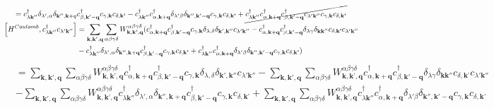 \documentclass[12pt,english,a4paper]{article}
\newcommand{\dg}{\dagger}
\begin{document}
\begin{appendices}
\begin{align}
= c^\dg_{\lambda \textbf{k}''} \delta_{\lambda',\alpha} \delta_{\textbf{k}'',\textbf{k}+q} &c_{\beta, \textbf{k}' - \textbf{q}}^\dg c_{\gamma, \textbf{k}}c_{\delta, \textbf{k'}} - c^\dg_{\lambda \textbf{k}''}  c_{\alpha, \textbf{k}+\textbf{q}}^\dg \delta_{\lambda'\beta} \delta_{\textbf{k}'',\textbf{k}'-\textbf{q}} c_{\gamma, \textbf{k}}c_{\delta, \textbf{k'}}
+ \cancel{c^\dg_{\lambda \textbf{k}''}  c_{\alpha, \textbf{k}+\textbf{q}}^\dg c_{\beta, \textbf{k}' - \textbf{q}}^\dg c_{\lambda' \textbf{k}''}  c_{\gamma, \textbf{k}}c_{\delta, \textbf{k'}}} \nonumber\\
%
%
\comm{H^{Coulomb}}{c^\dg_{\lambda \textbf{k}''} c_{\lambda' \textbf{k}''}} &= \sum_{\textbf{k}, \textbf{k}', \textbf{q}} \sum_{\alpha \beta \gamma \delta} W^{\alpha \beta \gamma \delta}_{\textbf{k},\textbf{k'},\textbf{q}}(c_{\alpha, \textbf{k}+\textbf{q}}^\dg c_{\beta, \textbf{k}' - \textbf{q}}^\dg c_{\gamma, \textbf{k}}\delta_{\lambda,\delta} \delta_{\textbf{k}',\textbf{k}''} c_{\lambda' \textbf{k}''} - c_{\alpha, \textbf{k}+\textbf{q}}^\dg c_{\beta, \textbf{k}' - \textbf{q}}^\dg \delta_{\lambda \gamma} \delta_{\textbf{k}\textbf{k}''}c_{\delta, \textbf{k'}} c_{\lambda' \textbf{k}''}\nonumber \\
&- c^\dg_{\lambda \textbf{k}''} \delta_{\lambda',\alpha} \delta_{\textbf{k}'',\textbf{k}+\textbf{q}} c_{\beta, \textbf{k}' - \textbf{q}}^\dg c_{\gamma, \textbf{k}}c_{\delta, \textbf{k'}} + c^\dg_{\lambda \textbf{k}''}  c_{\alpha, \textbf{k}+\textbf{q}}^\dg \delta_{\lambda'\beta} \delta_{\textbf{k}'',\textbf{k}'-\textbf{q}} c_{\gamma, \textbf{k}}c_{\delta, \textbf{k'}})\nonumber
\end{align}
\begin{align}
	&= \sum_{\textbf{k}, \textbf{k}', \textbf{q}} \sum_{\alpha \beta \gamma \delta} W^{\alpha \beta \gamma \delta}_{\textbf{k},\textbf{k'},\textbf{q}}c_{\alpha, \textbf{k}+\textbf{q}}^\dg c_{\beta, \textbf{k}' - \textbf{q}}^\dg c_{\gamma, \textbf{k}}\delta_{\lambda,\delta} \delta_{\textbf{k}',\textbf{k}''} c_{\lambda' \textbf{k}''}- \sum_{\textbf{k}, \textbf{k}', \textbf{q}} \sum_{\alpha \beta \gamma \delta} W^{\alpha \beta \gamma \delta}_{\textbf{k},\textbf{k'},\textbf{q}}c_{\alpha, \textbf{k}+\textbf{q}}^\dg c_{\beta, \textbf{k}' - \textbf{q}}^\dg \delta_{\lambda \gamma} \delta_{\textbf{k}\textbf{k}''}c_{\delta, \textbf{k'}} c_{\lambda' \textbf{k}''}\nonumber \\
	&- \sum_{\textbf{k}, \textbf{k}', \textbf{q}} \sum_{\alpha \beta \gamma \delta} W^{\alpha \beta \gamma \delta}_{\textbf{k},\textbf{k'},\textbf{q}}c^\dg_{\lambda \textbf{k}''} \delta_{\lambda',\alpha} \delta_{\textbf{k}'',\textbf{k}+\textbf{q}} c_{\beta, \textbf{k}' - \textbf{q}}^\dg c_{\gamma, \textbf{k}}c_{\delta, \textbf{k'}} + \sum_{\textbf{k}, \textbf{k}', \textbf{q}} \sum_{\alpha \beta \gamma \delta} W^{\alpha \beta \gamma \delta}_{\textbf{k},\textbf{k'},\textbf{q}}c^\dg_{\lambda \textbf{k}''}  c_{\alpha, \textbf{k}+\textbf{q}}^\dg \delta_{\lambda'\beta} \delta_{\textbf{k}'',\textbf{k}'-\textbf{q}} c_{\gamma, \textbf{k}}c_{\delta, \textbf{k'}}\nonumber \\

\end{align}
\end{appendices}
\end{document}
